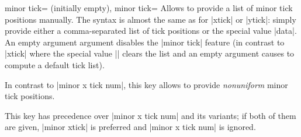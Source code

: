 \begin{pgfplotsxykeylist}{%
    minor \x tick= (initially empty),%
    minor tick=%
}
    Allows to provide a list of minor tick positions manually. The syntax is
    almost the same as for |xtick| or |ytick|: simply provide either a
    comma-separated list of tick positions or the special value |data|. An
    empty argument argument disables the |minor tick| feature (in contrast to
    |xtick| where the special value |\empty| clears the list and an empty
    argument causes \PGFPlots{} to compute a default tick list).

    In contrast to |minor x tick num|, this key allows to provide
    \emph{nonuniform} minor tick positions.
\begin{codeexample}[]
\end{codeexample}

\begin{codeexample}[]
\end{codeexample}

    This key has precedence over |minor x tick num| and its variants; if both
    of them are given, |minor xtick| is preferred and |minor x tick num| is
    ignored.
\end{pgfplotsxykeylist}

